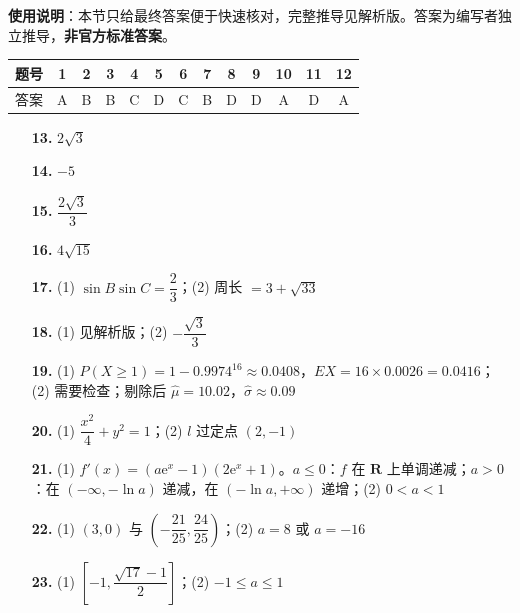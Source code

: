 
\begin{gknotice}
\textbf{使用说明}：本节只给最终答案便于快速核对，完整推导见解析版。答案为编写者独立推导，\textbf{非官方标准答案}。
\end{gknotice}

\begin{center}\begin{tabular}{ccccccccccccc}
\toprule
题号 & 1 & 2 & 3 & 4 & 5 & 6 & 7 & 8 & 9 & 10 & 11 & 12 \\
\midrule
答案 & A & B & B & C & D & C & B & D & D & A & D & A \\
\bottomrule
\end{tabular}\end{center}

\begin{itemize}[leftmargin=2.6em]
  \item[\textbf{13.}] $2\sqrt3$
  \item[\textbf{14.}] $-5$
  \item[\textbf{15.}] $\dfrac{2\sqrt3}3$
  \item[\textbf{16.}] $4\sqrt{15}$
\end{itemize}

\begin{itemize}[leftmargin=2.6em]
  \item[\textbf{17.}] (1) $\sin B\sin C=\dfrac23$；(2) 周长 $=3+\sqrt{33}$
  \item[\textbf{18.}] (1) 见解析版；(2) $-\dfrac{\sqrt3}3$
  \item[\textbf{19.}] (1) $P(X\ge1)=1-0.9974^{16}\approx0.0408$，$EX=16\times0.0026=0.0416$；(2) 需要检查；剔除后 $\hat\mu=10.02$，$\hat\sigma\approx0.09$
  \item[\textbf{20.}] (1) $\dfrac{x^{2}}4+y^{2}=1$；(2) $l$ 过定点 $(2,-1)$
  \item[\textbf{21.}] (1) $f'(x)=\left(a\mathrm e^{x}-1\right)\left(2\mathrm e^{x}+1\right)$。$a\le0$：$f$ 在 $\mathbf R$ 上单调递减；$a>0$：在 $(-\infty,-\ln a)$ 递减，在 $(-\ln a,+\infty)$ 递增；(2) $0<a<1$
\end{itemize}

\begin{itemize}[leftmargin=2.6em]
  \item[\textbf{22.}] (1) $(3,0)$ 与 $\left(-\dfrac{21}{25},\dfrac{24}{25}\right)$；(2) $a=8$ 或 $a=-16$
  \item[\textbf{23.}] (1) $\left[-1,\dfrac{\sqrt{17}-1}2\right]$；(2) $-1\le a\le1$
\end{itemize}
